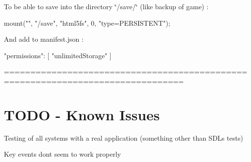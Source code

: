 To be able to save into the directory \char`\"{}/save/\char`\"{} (like backup of game) \+: \begin{DoxyVerb}mount("", "/save", "html5fs", 0, "type=PERSISTENT");
\end{DoxyVerb}


And add to manifest.\+json \+: \begin{DoxyVerb}"permissions": [
    "unlimitedStorage"
]
\end{DoxyVerb}


================================================================================ \section*{T\+O\+DO -\/ Known Issues }


\begin{DoxyItemize}
\item Testing of all systems with a real application (something other than S\+DL\textquotesingle{}s tests)
\item Key events don\textquotesingle{}t seem to work properly 
\end{DoxyItemize}